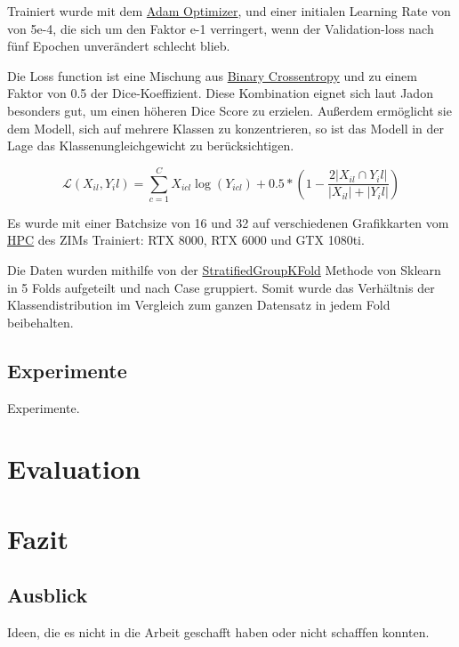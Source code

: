  Trainiert wurde mit dem
\href{https://optimization.cbe.cornell.edu/index.php?title=Adam}{Adam Optimizer},
 und einer initialen Learning Rate von von 5e-4, die sich um den Faktor e-1 verringert, wenn der Validation-loss nach fünf Epochen unverändert schlecht blieb. 
 
 Die Loss function ist eine Mischung aus 
\href{https://www.analyticsvidhya.com/blog/2021/03/binary-cross-entropy-log-loss-for-binary-classification/}{Binary Crossentropy} und zu einem Faktor von 0.5 der Dice-Koeffizient. Diese Kombination eignet sich laut Jadon  \citep{Jadon_2020} besonders gut, um einen höheren Dice Score zu erzielen. Außerdem ermöglicht sie dem Modell, sich auf mehrere Klassen zu konzentrieren, so ist das Modell in der Lage das Klassenungleichgewicht zu berücksichtigen. 

\begin{equation}
\mathcal{L}\left(X_{i l},{Y_{i}} l\right)= \sum_{c=1}^{C} X_{i c l} \log \left({Y}_{i c l}\right)+0.5 *\left(1-\frac{2\left|X_{i l} \cap {Y_{i}} l\right|}{\left|X_{i l}\right|+\left|{Y_{i}} l\right|}\right)
\end{equation}

Es wurde mit einer Batchsize von 16 und 32 auf verschiedenen Grafikkarten vom 
\href{https://wiki.hhu.de/display/HPC/Abschlussarbeiten+im+HPC}{HPC} des ZIMs Trainiert: RTX 8000, RTX 6000 und GTX 1080ti.

Die Daten wurden mithilfe von der 
\href{https://scikit-learn.org/stable/modules/generated/sklearn.model_selection.StratifiedGroupKFold.html}{StratifiedGroupKFold} Methode von Sklearn in 5 Folds aufgeteilt und nach Case gruppiert. Somit wurde das Verhältnis der Klassendistribution im Vergleich zum ganzen Datensatz in jedem Fold beibehalten.

\subsection{Experimente}
Experimente.

\section{Evaluation}\raggedbottom

\section{Fazit}\raggedbottom

\subsection{Ausblick}
Ideen, die es nicht in die Arbeit geschafft haben oder nicht schafffen konnten.


\pagebreak
